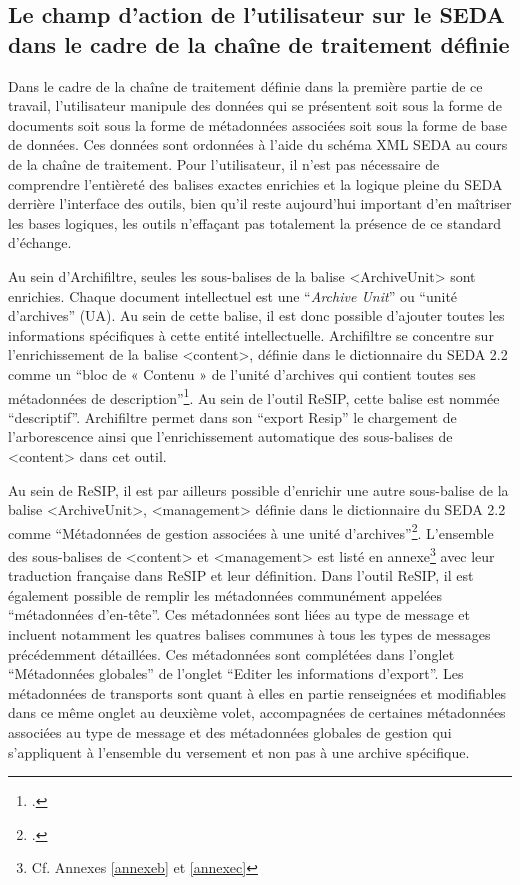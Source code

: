 \subsection{Le champ d’action de l’utilisateur sur le SEDA dans le cadre de la chaîne de traitement définie}
Dans le cadre de la chaîne de traitement définie dans la première partie de ce travail, l’utilisateur manipule des données qui se présentent soit sous la forme de documents soit sous la forme de métadonnées associées soit sous la forme de base de données. Ces données sont ordonnées à l’aide du schéma \gls{XML} \gls{SEDA} au cours de la chaîne de traitement. Pour l’utilisateur, il n’est pas nécessaire de comprendre l’entièreté des balises exactes enrichies et la logique pleine du \gls{SEDA} derrière l’interface des outils, bien qu’il reste aujourd’hui important d’en maîtriser les bases logiques, les outils n’effaçant pas totalement la présence de ce standard d’échange.


Au sein d’\gls{Archifiltre}, seules les sous-balises de la balise <ArchiveUnit> sont enrichies. Chaque document intellectuel est une \enquote{\textit{Archive Unit}} ou \enquote{\gls{unité d’archives}} (UA). Au sein de cette balise, il est donc possible d’ajouter toutes les informations spécifiques à cette entité intellectuelle. \gls{Archifiltre} se concentre sur l’enrichissement de la balise <content>, définie dans le dictionnaire du \gls{SEDA} 2.2 comme un \enquote{bloc de « Contenu » de l’\gls{unité d’archives} qui contient toutes ses métadonnées de description}\footcite[p.13]{siaf_dictionnaire_2022}. Au sein de l’outil ReSIP, cette balise est nommée \enquote{descriptif}. Archifiltre permet dans son \enquote{export Resip} le chargement de l’arborescence ainsi que l’enrichissement automatique des sous-balises de <content> dans cet outil. 


Au sein de ReSIP, il est par ailleurs possible d’enrichir une autre sous-balise de la balise <ArchiveUnit>, <management> définie dans le dictionnaire du SEDA 2.2 comme \enquote{Métadonnées de gestion associées à une \gls{unité d’archives}}\footcite[p.13]{siaf_dictionnaire_2022}. L’ensemble des sous-balises de <content> et <management> est listé en annexe\footnote{Cf. Annexes \ref{annexeb} et \ref{annexec}} avec leur traduction française dans ReSIP et  leur définition. Dans l’outil ReSIP, il est également possible de remplir les métadonnées communément appelées \enquote{métadonnées d’en-tête}. Ces métadonnées sont liées au type de message et incluent notamment les quatres balises communes à tous les types de messages précédemment détaillées. Ces métadonnées sont complétées dans l’onglet \enquote{Métadonnées globales} de l’onglet \enquote{Editer les informations d’export}. Les métadonnées de transports sont quant à elles en partie renseignées et modifiables dans ce même onglet au deuxième volet, accompagnées de certaines métadonnées associées au type de message et des métadonnées globales de gestion qui s’appliquent à l’ensemble du versement et non pas à une archive spécifique.

